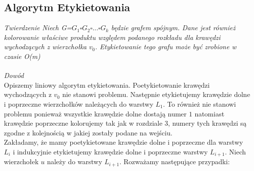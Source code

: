 \documentclass[12pt,a4paper,titlepage]{article}
\begin{document}
\subsection{Algorytm Etykietowania}
\textit{Twierdzenie Niech G=$G_1 \square G_2 \square ... \square G_k$ będzie grafem spójnym. Dane jest również kolorowanie właściwe produktu względem podanego rozkładu dla krawędzi wychodzących z wierzchołka $v_0$. Etykietowanie tego grafu może być zrobione w czasie O(m)}\\
\\
\textit{Dowód}\\
Opiszemy liniowy algorytm etykietowania. Poetykietowanie krawędzi wychodzących z $v_0$ nie stanowi problemu. Następnie etykietujemy krawędzie dolne i poprzeczne wierzchołków należących do warstwy $L_1$. To również nie stanowi problemu ponieważ wszystkie krawędzie dolne dostają numer $1$ natomiast krawędzie poprzeczne kolorujemy tak jak w rozdziale 3, numery tych krawędzi są zgodne z kolejnością w jakiej zostały podane na wejściu. \\
Zakładamy, że mamy poetykietowane krawędzie dolne i poprzeczne dla warstwy $L_i$ i indukcyjnie etykietujemy krawędzie dolne i poprzeczne warstwy $L_{i+1}$. Niech wierzchołek $u$ należy do warstwy $L_{i+1}$. Rozważamy następujące przypadki:\\
\end{document}
